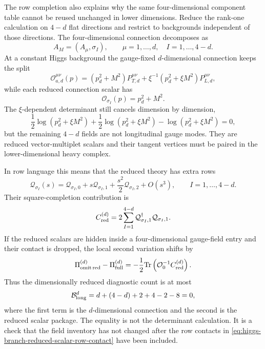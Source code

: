 \begin{example}
\label{ex:higgs-branch-dimensional-reduction-row-audit}
The row completion also explains why the same four-dimensional component table
cannot be reused unchanged in lower dimensions.  Reduce the rank-one
calculation on \(4-d\) flat directions and restrict to backgrounds independent
of those directions.  The four-dimensional connection decomposes as
\[
  A_M=(A_\mu,\sigma_I),
  \qquad
  \mu=1,\ldots,d,\quad I=1,\ldots,4-d .
\]
At a constant Higgs background the gauge-fixed \(d\)-dimensional connection
keeps the split
\[
  {\mathcal O}_{a,d}^{\mu\nu}(p)
  =
  (p_d^2+M^2)P_{T,d}^{\mu\nu}
  +
  \xi^{-1}(p_d^2+\xi M^2)P_{L,d}^{\mu\nu},
\]
while each reduced connection scalar has
\[
  {\mathcal O}_{\sigma_I}(p)=p_d^2+M^2 .
\]
The \(\xi\)-dependent determinant still cancels dimension by dimension,
\[
  \frac12\log(p_d^2+\xi M^2)
  +
  \frac12\log(p_d^2+\xi M^2)
  -
  \log(p_d^2+\xi M^2)
  =
  0,
\]
but the remaining \(4-d\) fields are not longitudinal gauge modes.  They are
reduced vector-multiplet scalars and their tangent vertices must be paired in
the lower-dimensional heavy complex.

In row language this means that the reduced theory has extra rows
\[
  {\mathcal Q}_{\sigma_I}(s)
  =
  {\mathcal Q}_{\sigma_I,0}
  +
  s{\mathcal Q}_{\sigma_I,1}
  +
  \frac{s^2}{2}{\mathcal Q}_{\sigma_I,2}
  +
  O(s^3),
  \qquad I=1,\ldots,4-d .
\]
Their square-completion contribution is
\begin{equation}
  C_{\rm red}^{(d)}
  =
  2\sum_{I=1}^{4-d}
  {\mathcal Q}_{\sigma_I,1}^\dagger{\mathcal Q}_{\sigma_I,1}.
  \label{eq:higgs-branch-reduced-scalar-row-contact}
\end{equation}
If the reduced scalars are hidden inside a four-dimensional gauge-field entry
and their contact is dropped, the local second variation shifts by
\begin{equation}
  \Pi_{\rm omit\,red}^{(d)}-\Pi_{\rm full}^{(d)}
  =
  -\frac12{\rm Tr}
  \left({\mathcal O}_0^{-1}C_{\rm red}^{(d)}\right).
  \label{eq:higgs-branch-reduced-scalar-contact-residual}
\end{equation}
Thus the dimensionally reduced diagnostic count is at most
\begin{equation}
  {\mathcal B}_{\rm long}^{d}
  =
  d+(4-d)+2+4-2-8
  =
  0,
  \label{eq:higgs-branch-d-dimensional-balance-diagnostic}
\end{equation}
where the first term is the \(d\)-dimensional connection and the second is the
reduced scalar package.  The equality is not the determinant calculation.  It is
a check that the field inventory has not changed after the row contacts in
\eqref{eq:higgs-branch-reduced-scalar-row-contact} have been included.


\end{example}
